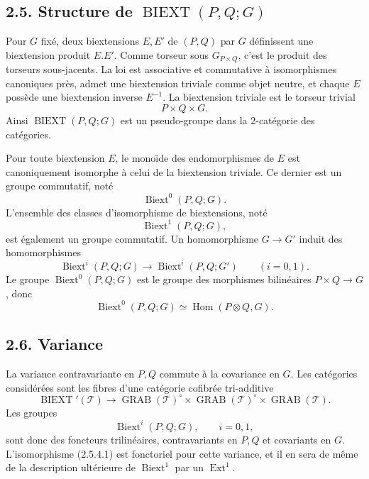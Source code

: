 \documentclass[11pt]{article}
\providecommand{\Ext}{\operatorname{Ext}}
\providecommand{\BIEXT}{\operatorname{BIEXT}}
\providecommand{\Biext}{\operatorname{Biext}}
\providecommand{\GRAB}{\operatorname{GRAB}}
\begin{document}
\subsection*{2.5. Structure de \(\BIEXT(P,Q;G)\)}
Pour \(G\) fixé, deux biextensions \(E,E'\) de \((P,Q)\) par \(G\) définissent une biextension produit \(E.E'\).  Comme torseur sous \(G_{P\times Q}\), c'est le produit des torseurs sous-jacents.  La loi est associative et commutative à isomorphismes canoniques près, admet une biextension triviale comme objet neutre, et chaque \(E\) possède une biextension inverse \(E^{-1}\).  La biextension triviale est le torseur trivial
\begin{equation}\tag{2.5.1.1}
  P\times Q\times G.
\end{equation}
Ainsi \(\BIEXT(P,Q;G)\) est un pseudo-groupe dans la 2-catégorie des catégories.

Pour toute biextension \(E\), le monoïde des endomorphismes de \(E\) est canoniquement isomorphe à celui de la biextension triviale.  Ce dernier est un groupe commutatif, noté
\begin{equation}\tag{2.5.2.1}
  \Biext^0(P,Q;G).
\end{equation}
L'ensemble des classes d'isomorphisme de biextensions, noté
\begin{equation}\tag{2.5.2.2}
  \Biext^1(P,Q;G),
\end{equation}
est également un groupe commutatif.  Un homomorphisme \(G\to G'\) induit des homomorphismes
\begin{equation}\tag{2.5.3.2}
  \Biext^i(P,Q;G)\longrightarrow\Biext^i(P,Q;G')\qquad(i=0,1).
\end{equation}
Le groupe \(\Biext^0(P,Q;G)\) est le groupe des morphismes bilinéaires \(P\times Q\to G\), donc
\begin{equation}\tag{2.5.4.1}
  \Biext^0(P,Q;G)\simeq\operatorname{Hom}(P\otimes Q,G).
\end{equation}

\subsection*{2.6. Variance}
La variance contravariante en \(P,Q\) commute à la covariance en \(G\).  Les catégories considérées sont les fibres d'une catégorie cofibrée tri-additive
\begin{equation}\tag{2.6.1}
  \BIEXT'(\mathcal T)\longrightarrow
  \GRAB(\mathcal T)^\circ\times\GRAB(\mathcal T)^\circ\times\GRAB(\mathcal T).
\end{equation}
Les groupes
\begin{equation}\tag{2.6.2}
  \Biext^i(P,Q;G),\qquad i=0,1,
\end{equation}
sont donc des foncteurs trilinéaires, contravariants en \(P,Q\) et covariants en \(G\).  L'isomorphisme (2.5.4.1) est fonctoriel pour cette variance, et il en sera de même de la description ultérieure de \(\Biext^1\) par un \(\Ext^1\).
\end{document}
